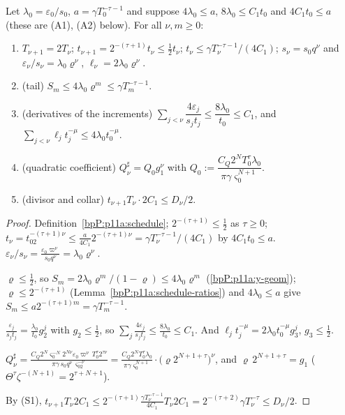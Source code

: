 \begin{lemma}\label{bpP:p11a:schedule-props}
Let $\lambda_0=\varepsilon_0/s_0$, $a=\gamma T_0^{-\tau-1}$ and suppose $4\lambda_0\le a$, $8\lambda_0\le C_1t_0$ and $4C_1t_0\le a$ (these are (A1), (A2) below). For all $\nu,m\ge0$:
\begin{enumerate}[label=(S\arabic*),ref=(S\arabic*)]
\item\label{bpP:p11a:SC1} $T_{\nu+1}=2T_\nu$; $t_{\nu+1}=2^{-(\tau+1)}t_\nu\le\frac12t_\nu$; $t_\nu\le\gamma T_\nu^{-\tau-1}/(4C_1)$; $s_\nu=s_0q^\nu$ and $\varepsilon_\nu/s_\nu=\lambda_0\varrho^\nu$, $\ell_\nu=2\lambda_0\varrho^\nu$.
\item\label{bpP:p11a:SC2} (tail) $S_m\le4\lambda_0\varrho^m\le\gamma T_m^{-\tau-1}$.
\item\label{bpP:p11a:SC3} (derivatives of the increments) $\sum_{j<\nu}\dfrac{4\varepsilon_j}{s_jt_j}\le\dfrac{8\lambda_0}{t_0}\le C_1$, and $\sum_{j<\nu}\ell_jt_j^{-\mu}\le4\lambda_0t_0^{-\mu}$.
\item\label{bpP:p11a:SC4} (quadratic coefficient) $Q^\sharp_\nu=Q_0g_1^\nu$ with $Q_0:=\dfrac{C_Q2^NT_0^\tau\lambda_0}{\pi\gamma\varsigma_0^{N+1}}$.
\item\label{bpP:p11a:SC5} (divisor and collar) $t_{\nu+1}T_\nu\cdot2C_1\le D_\nu/2$.
\end{enumerate}
\end{lemma}
\begin{proof}
\label{stepP:p11a:sp-1} Definition~\ref{bpP:p11a:schedule}; $2^{-(\tau+1)}\le\frac12$ as $\tau\ge0$; $t_\nu=t_02^{-(\tau+1)\nu}\le\frac a{4C_1}2^{-(\tau+1)\nu}=\gamma T_\nu^{-\tau-1}/(4C_1)$ by $4C_1t_0\le a$. $\varepsilon_\nu/s_\nu=\frac{\varepsilon_0\varpi^\nu}{s_0q^\nu}=\lambda_0\varrho^\nu$.

\label{stepP:p11a:sp-2} $\varrho\le\frac12$, so $S_m=2\lambda_0\varrho^m/(1-\varrho)\le4\lambda_0\varrho^m$ (\ref{bpP:p11a:y-geom}); $\varrho\le2^{-(\tau+1)}$ (Lemma~\ref{bpP:p11a:schedule-ratios}) and $4\lambda_0\le a$ give $S_m\le a2^{-(\tau+1)m}=\gamma T_m^{-\tau-1}$.

\label{stepP:p11a:sp-3} $\frac{\varepsilon_j}{s_jt_j}=\frac{\lambda_0}{t_0}g_2^j$ with $g_2\le\frac12$, so $\sum_j\frac{4\varepsilon_j}{s_jt_j}\le\frac{8\lambda_0}{t_0}\le C_1$. And $\ell_jt_j^{-\mu}=2\lambda_0t_0^{-\mu}g_3^j$, $g_3\le\frac12$.

\label{stepP:p11a:sp-4} $Q^\sharp_\nu=\frac{C_Q2^N\varsigma_0^{-N}2^{N\nu}\varepsilon_0\varpi^\nu\,T_0^\tau2^{\tau\nu}}{\pi\gamma\,s_0q^\nu\,\varsigma_02^{-\nu}}=\frac{C_Q2^NT_0^\tau\lambda_0}{\pi\gamma\varsigma_0^{N+1}}\cdot\bigl(\varrho2^{N+1+\tau}\bigr)^\nu$, and $\varrho\,2^{N+1+\tau}=g_1$ ($\Theta^\tau\zeta^{-(N+1)}=2^{\tau+N+1}$).

\label{stepP:p11a:sp-5} By (S1), $t_{\nu+1}T_\nu2C_1\le2^{-(\tau+1)}\frac{\gamma T_\nu^{-\tau-1}}{4C_1}T_\nu2C_1=2^{-(\tau+2)}\gamma T_\nu^{-\tau}\le D_\nu/2$.
\end{proof}

